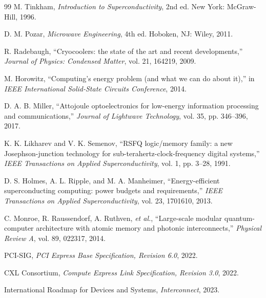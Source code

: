 \documentclass[10pt,letterpaper]{article}
\begin{document}
\begin{thebibliography}{99}
 M. Tinkham, \emph{Introduction to Superconductivity}, 2nd ed. New York: McGraw-Hill, 1996.

 D. M. Pozar, \emph{Microwave Engineering}, 4th ed. Hoboken, NJ: Wiley, 2011.

 R. Radebaugh, ``Cryocoolers: the state of the art and recent developments,'' \emph{Journal of Physics: Condensed Matter}, vol. 21, 164219, 2009.

 M. Horowitz, ``Computing's energy problem (and what we can do about it),'' in \emph{IEEE International Solid-State Circuits Conference}, 2014.

 D. A. B. Miller, ``Attojoule optoelectronics for low-energy information processing and communications,'' \emph{Journal of Lightwave Technology}, vol. 35, pp. 346--396, 2017.

 K. K. Likharev and V. K. Semenov, ``RSFQ logic/memory family: a new Josephson-junction technology for sub-terahertz-clock-frequency digital systems,'' \emph{IEEE Transactions on Applied Superconductivity}, vol. 1, pp. 3--28, 1991.

 D. S. Holmes, A. L. Ripple, and M. A. Manheimer, ``Energy-efficient superconducting computing: power budgets and requirements,'' \emph{IEEE Transactions on Applied Superconductivity}, vol. 23, 1701610, 2013.

 C. Monroe, R. Raussendorf, A. Ruthven, \emph{et al.}, ``Large-scale modular quantum-computer architecture with atomic memory and photonic interconnects,'' \emph{Physical Review A}, vol. 89, 022317, 2014.

 PCI-SIG, \emph{PCI Express Base Specification, Revision 6.0}, 2022.

 CXL Consortium, \emph{Compute Express Link Specification, Revision 3.0}, 2022.

 International Roadmap for Devices and Systems, \emph{Interconnect}, 2023.

\end{thebibliography}
\endgroup
\end{document}
